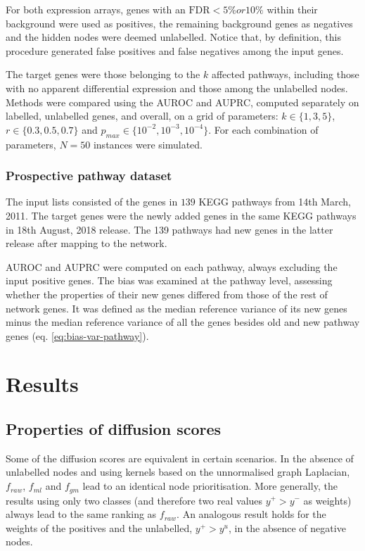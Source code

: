 \documentclass[final]{bioinfo}
\begin{document}
\begin{methods}
For both expression arrays, genes with an $ \textrm{FDR}<5\% or 10\% $ within their background were used as positives, the remaining background genes as negatives and the hidden nodes were deemed unlabelled. 
Notice that, by definition, this procedure generated false positives and false negatives among the input genes. 

The target genes were those belonging to the $k$ affected pathways, including those with no apparent differential expression and those among the unlabelled nodes.
Methods were compared using the AUROC and AUPRC, computed separately on labelled, unlabelled genes, and overall, on a grid of parameters: $k \in \{1,3,5\}$, $r \in \{0.3,0.5,0.7\}$ and $p_{max} \in \{10^{-2},10^{-3},10^{-4}\}$. 
For each combination of parameters, $N = 50$ instances were simulated.

\subsubsection*{Prospective pathway dataset}

The input lists consisted of the genes in $139$ KEGG pathways from 14th March, 2011. 
The target genes were the newly added genes in the same KEGG pathways in 18th August, 2018 release.
The 139 pathways had new genes in the latter release after mapping to the network. 

AUROC and AUPRC were computed on each pathway, always excluding the input positive genes. 
The bias was examined at the pathway level, assessing whether the properties of their new genes differed from those of the rest of network genes. 
It was defined as the median reference variance of its new genes minus the median reference variance of all the genes besides old and new pathway genes (eq. \ref{eq:bias-var-pathway}). 

\end{methods}

\section{Results}

\subsection*{Properties of diffusion scores}

Some of the diffusion scores are equivalent in certain scenarios. 
In the absence of unlabelled nodes and using kernels based on the unnormalised graph Laplacian, $f_{raw}$, $f_{ml}$ and $f_{gm}$ lead to an identical node prioritisation. 
More generally, the results using only two classes (and therefore two real values $y^+ > y^-$ as weights) always lead to the same ranking as $f_{raw}$. 
An analogous result holds for the weights of the positives and the unlabelled, $y^+ > y^u$, in the absence of negative nodes. 
\end{document}
